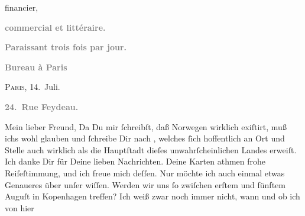 \begin{ledgroupsized}[t]{13cm}
\begin{otherlanguage}{french}
{{                        financier,}}\end{otherlanguage}\pend
           \pstart
           \begin{otherlanguage}{french}\textcolor{gray}{\textbf{commercial et littéraire.}}\end{otherlanguage}\pend
           \pstart
           \begin{otherlanguage}{french}\textcolor{gray}{\textbf{\textbf{Paraissant trois fois par jour.}}}\end{otherlanguage}\pend
           \pstart
           \begin{otherlanguage}{french}\textcolor{gray}{\textbf{\textbf{Bureau à Paris}}}\end{otherlanguage}\hfill \textsc{Paris}, 14. Juli.\pend
           \pstart
           \begin{otherlanguage}{french}\textcolor{gray}{\textbf{\textbf{24. Rue Feydeau.}}}\end{otherlanguage}\pend
           \pstart\center{}Mein lieber Freund,\pend\pstart
           Da Du mir ſchreibſt, daß Norwegen wirklich
               exiſtirt, muß ichs wohl glauben und ſchreibe Dir nach \label{K_L02781-1v}\label{K_L02781-1h}, welches ſich hoffentlich an Ort und Stelle auch
               wirklich als die Hauptſtadt
               dieſes unwahrſcheinlichen Landes erweiſt.\pend
           \pstart
           Ich danke Dir für Deine lieben Nachrichten. Deine Karten athmen frohe Reiſeſtimmung,
               und ich freue mich deſſen.\pend
           \pstart
           {\pb}Nur möchte ich auch einmal etwas Genaueres über
               unſer \label{K_L02781-2v}\label{K_L02781-2h} wiſſen. Werden wir uns ſo zwiſchen erſtem und
                  fünftem Auguſt in Kopenhagen treffen? Ich weiß zwar noch immer nicht, wann und ob ich von hier

\end{ledgroupsized}
